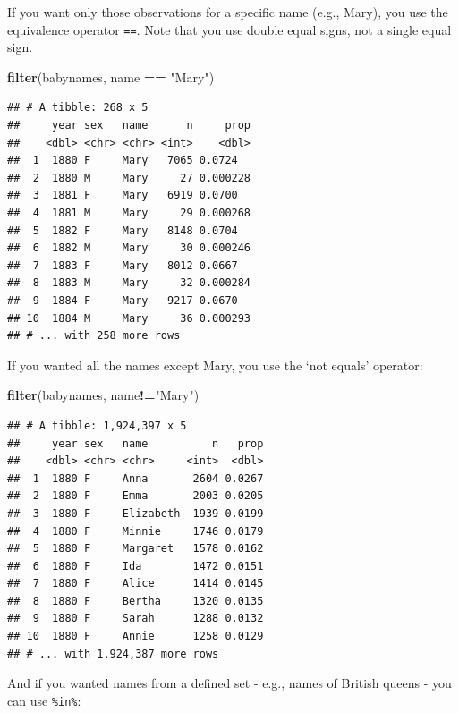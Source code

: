 \documentclass[]{book}
\newenvironment{Shaded}{\begin{snugshade}}{\end{snugshade}}
\newcommand{\KeywordTok}[1]{\textcolor[rgb]{0.13,0.29,0.53}{\textbf{#1}}}
\newcommand{\NormalTok}[1]{#1}
\newcommand{\OperatorTok}[1]{\textcolor[rgb]{0.81,0.36,0.00}{\textbf{#1}}}
\newcommand{\StringTok}[1]{\textcolor[rgb]{0.31,0.60,0.02}{#1}}
\begin{document}
If you want only those observations for a specific name (e.g., Mary), you use the equivalence operator \texttt{==}. Note that you use double equal signs, not a single equal sign.

\begin{Shaded}
\begin{Highlighting}[]
\KeywordTok{filter}\NormalTok{(babynames, name }\OperatorTok{==}\StringTok{ "Mary"}\NormalTok{)}
\end{Highlighting}
\end{Shaded}

\begin{verbatim}
## # A tibble: 268 x 5
##     year sex   name      n     prop
##    <dbl> <chr> <chr> <int>    <dbl>
##  1  1880 F     Mary   7065 0.0724  
##  2  1880 M     Mary     27 0.000228
##  3  1881 F     Mary   6919 0.0700  
##  4  1881 M     Mary     29 0.000268
##  5  1882 F     Mary   8148 0.0704  
##  6  1882 M     Mary     30 0.000246
##  7  1883 F     Mary   8012 0.0667  
##  8  1883 M     Mary     32 0.000284
##  9  1884 F     Mary   9217 0.0670  
## 10  1884 M     Mary     36 0.000293
## # ... with 258 more rows
\end{verbatim}

If you wanted all the names except Mary, you use the `not equals' operator:

\begin{Shaded}
\begin{Highlighting}[]
\KeywordTok{filter}\NormalTok{(babynames, name}\OperatorTok{!=}\StringTok{"Mary"}\NormalTok{) }
\end{Highlighting}
\end{Shaded}

\begin{verbatim}
## # A tibble: 1,924,397 x 5
##     year sex   name          n   prop
##    <dbl> <chr> <chr>     <int>  <dbl>
##  1  1880 F     Anna       2604 0.0267
##  2  1880 F     Emma       2003 0.0205
##  3  1880 F     Elizabeth  1939 0.0199
##  4  1880 F     Minnie     1746 0.0179
##  5  1880 F     Margaret   1578 0.0162
##  6  1880 F     Ida        1472 0.0151
##  7  1880 F     Alice      1414 0.0145
##  8  1880 F     Bertha     1320 0.0135
##  9  1880 F     Sarah      1288 0.0132
## 10  1880 F     Annie      1258 0.0129
## # ... with 1,924,387 more rows
\end{verbatim}

And if you wanted names from a defined set - e.g., names of British queens - you can use \texttt{\%in\%}:

\begin{Shaded}
\end{Shaded}
\end{document}
